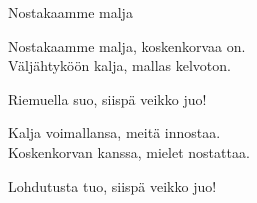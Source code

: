 \begin{song}{Nostakaamme malja}
	
	Nostakaamme malja, koskenkorvaa on.\\
	Väljähtyköön kalja, mallas kelvoton.\\
	\begin{repetition}	
		Riemuella suo, siispä veikko juo!
	\end{repetition}

	Kalja voimallansa, meitä innostaa.\\
	Koskenkorvan kanssa, mielet nostattaa.\\
	\begin{repetition}	
		Lohdutusta tuo, siispä veikko juo!
	\end{repetition}
	
\end{song}
